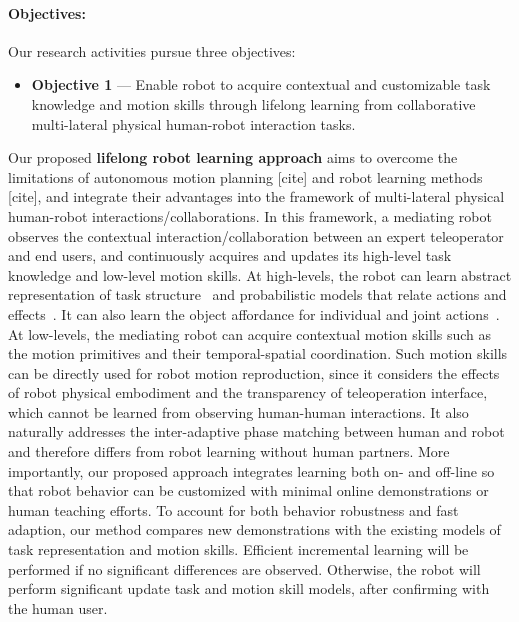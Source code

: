 \documentclass[letterpaper, 11 pt, onecolumn]{article}
\newcommand{\fig}[1]{Fig.~\ref{#1}}
\begin{document}

\paragraph*{Objectives:} Our research activities pursue three objectives: 


\begin{itemize}
\item \textbf{Objective 1} --- Enable robot to acquire contextual and customizable task knowledge and motion skills through lifelong learning from collaborative multi-lateral physical human-robot interaction tasks. 
\end{itemize}
\noindent
Our proposed \textbf{lifelong robot learning approach} aims to overcome the limitations of autonomous motion planning [cite] and robot learning methods [cite], and integrate their advantages into the framework of multi-lateral physical human-robot interactions/collaborations. In this framework, a mediating robot observes the contextual interaction/collaboration between an expert teleoperator and end users, and continuously acquires and updates its high-level task knowledge and low-level motion skills. At high-levels, the robot can learn abstract representation of task structure~\cite{} and probabilistic models that relate actions and effects~\cite{}. It can also learn the object affordance for individual and joint actions~\cite{knoblich2011psychological}. At low-levels, the mediating robot can acquire contextual motion skills such as the motion primitives and their temporal-spatial coordination. Such motion skills can be directly used for robot motion reproduction, since it considers the effects of robot physical embodiment and the transparency of teleoperation interface, which cannot be learned from observing human-human interactions. It also naturally addresses the inter-adaptive phase matching between human and robot and therefore differs from robot learning without human partners. More importantly, our proposed approach integrates learning both on- and off-line so that robot behavior can be customized with minimal online demonstrations or human teaching efforts. To account for both behavior robustness and fast adaption, our method compares new demonstrations with the existing models of task representation and motion skills. Efficient incremental learning will be performed if no significant differences are observed. Otherwise, the robot will perform significant update task and motion skill models, after confirming with the human user. 
\end{document}
